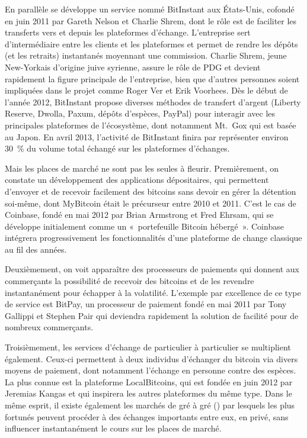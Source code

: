 En parallèle se développe un service nommé BitInstant aux États-Unis, cofondé en juin 2011 par Gareth Nelson et Charlie Shrem, dont le rôle est de faciliter les transferts vers et depuis les plateformes d'échange. L'entreprise sert d'intermédiaire entre les clients et les plateformes et permet de rendre les dépôts (et les retraits) instantanés moyennant une commission. Charlie Shrem, jeune New-Yorkais d'origine juive syrienne, assure le rôle de PDG et devient rapidement la figure principale de l'entreprise, bien que d'autres personnes soient impliquées dans le projet comme Roger Ver et Erik Voorhees. Dès le début de l'année 2012, BitInstant propose diverses méthodes de transfert d'argent (Liberty Reserve, Dwolla, Paxum, dépôts d'espèces, PayPal) pour interagir avec les principales plateformes de l'écosystème, dont notamment Mt.~Gox qui est basée au Japon. En avril 2013, l'activité de BitInstant finira par représenter environ 30~\% du volume total échangé sur les plateformes d'échanges.

Mais les places de marché ne sont pas les seules à fleurir. Premièrement, on constate un développement des applications dépositaires, qui permettent d'envoyer et de recevoir facilement des bitcoins sans devoir en gérer la détention soi-même, dont MyBitcoin était le précurseur entre 2010 et 2011. C'est le cas de Coinbase, fondé en mai 2012 par Brian Armstrong et Fred Ehrsam, qui se développe initialement comme un «~portefeuille Bitcoin hébergé~». Coinbase intégrera progressivement les fonctionnalités d'une plateforme de change classique au fil des années.

Deuxièmement, on voit apparaître des processeurs de paiements qui donnent aux commerçants la possibilité de recevoir des bitcoins et de les revendre instantanément pour échapper à la volatilité. L'exemple par excellence de ce type de service est BitPay, un processeur de paiement fondé en mai 2011 par Tony Gallippi et Stephen Pair qui deviendra rapidement la solution de facilité pour de nombreux commerçants.

Troisièmement, les services d'échange de particulier à particulier se multiplient également. Ceux-ci permettent à deux individus d'échanger du bitcoin via divers moyens de paiement, dont notamment l'échange en personne contre des espèces. La plus connue est la plateforme LocalBitcoins, qui est fondée en juin 2012 par Jeremias Kangas et qui inspirera les autres plateformes du même type. Dans le même esprit, il existe également les marchés de gré à gré () par lesquels les plus fortunés peuvent procéder à des échanges importants entre eux, en privé, sans influencer instantanément le cours sur les places de marché.

